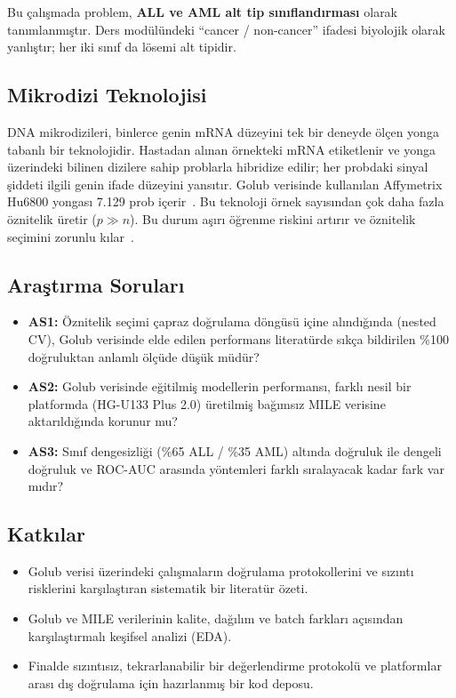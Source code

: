 \documentclass[conference]{IEEEtran}
\begin{document}
Bu çalışmada problem, \textbf{ALL ve AML alt tip sınıflandırması} olarak tanımlanmıştır. Ders modülündeki ``cancer / non-cancer'' ifadesi biyolojik olarak yanlıştır; her iki sınıf da lösemi alt tipidir.

\subsection{Mikrodizi Teknolojisi}
DNA mikrodizileri, binlerce genin mRNA düzeyini tek bir deneyde ölçen yonga tabanlı bir teknolojidir. Hastadan alınan örnekteki mRNA etiketlenir ve yonga üzerindeki bilinen dizilere sahip problarla hibridize edilir; her probdaki sinyal şiddeti ilgili genin ifade düzeyini yansıtır. Golub verisinde kullanılan Affymetrix Hu6800 yongası 7.129 prob içerir~\cite{golub1999}. Bu teknoloji örnek sayısından çok daha fazla öznitelik üretir ($p \gg n$). Bu durum aşırı öğrenme riskini artırır ve öznitelik seçimini zorunlu kılar~\cite{saeys2007}.

\subsection{Araştırma Soruları}
\begin{itemize}[leftmargin=*]
  \item \textbf{AS1:} Öznitelik seçimi çapraz doğrulama döngüsü içine alındığında (nested CV), Golub verisinde elde edilen performans literatürde sıkça bildirilen \%100 doğruluktan anlamlı ölçüde düşük müdür?
  \item \textbf{AS2:} Golub verisinde eğitilmiş modellerin performansı, farklı nesil bir platformda (HG-U133 Plus 2.0) üretilmiş bağımsız MILE verisine aktarıldığında korunur mu?
  \item \textbf{AS3:} Sınıf dengesizliği (\%65 ALL / \%35 AML) altında doğruluk ile dengeli doğruluk ve ROC-AUC arasında yöntemleri farklı sıralayacak kadar fark var mıdır?
\end{itemize}

\subsection{Katkılar}
\begin{itemize}[leftmargin=*]
  \item Golub verisi üzerindeki çalışmaların doğrulama protokollerini ve sızıntı risklerini karşılaştıran sistematik bir literatür özeti.
  \item Golub ve MILE verilerinin kalite, dağılım ve batch farkları açısından karşılaştırmalı keşifsel analizi (EDA).
  \item Finalde sızıntısız, tekrarlanabilir bir değerlendirme protokolü ve platformlar arası dış doğrulama için hazırlanmış bir kod deposu.
\end{itemize}
\end{document}
